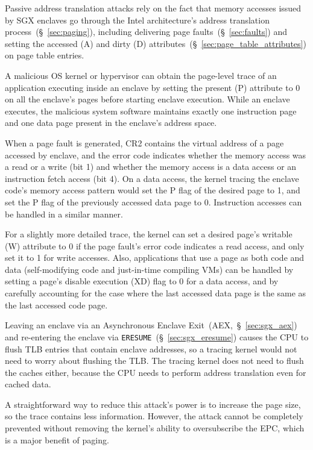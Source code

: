 Passive address translation attacks rely on the fact that memory accesses
issued by SGX enclaves go through the Intel architecture's address translation
process~(\S~\ref{sec:paging}), including delivering page
faults~(\S~\ref{sec:faults}) and setting the accessed (A) and dirty (D)
attributes~(\S~\ref{sec:page_table_attributes}) on page table entries.

A malicious OS kernel or hypervisor can obtain the page-level trace of an
application executing inside an enclave by setting the present (P) attribute to
0 on all the enclave's pages before starting enclave execution. While an
enclave executes, the malicious system software maintains exactly one
instruction page and one data page present in the enclave's address space.

When a page fault is generated, CR2 contains the virtual address of a page
accessed by enclave, and the error code indicates whether the memory access was
a read or a write (bit 1) and whether the memory access is a data access or
an instruction fetch access (bit 4). On a data access, the kernel tracing the
enclave code's memory access pattern would set the P flag of the desired page
to 1, and set the P flag of the previously accessed data page to 0. Instruction
accesses can be handled in a similar manner.

For a slightly more detailed trace, the kernel can set a desired page's
writable (W) attribute to 0 if the page fault's error code indicates a read
access, and only set it to 1 for write accesses. Also, applications that use a
page as both code and data (self-modifying code and just-in-time compiling VMs)
can be handled by setting a page's disable execution (XD) flag to 0 for a data
access, and by carefully accounting for the case where the last accessed data
page is the same as the last accessed code page.

Leaving an enclave via an Asynchronous Enclave Exit~(AEX,~\S~\ref{sec:sgx_aex})
and re-entering the enclave via \texttt{ERESUME}~(\S~\ref{sec:sgx_eresume})
causes the CPU to flush TLB entries that contain enclave addresses, so a
tracing kernel would not need to worry about flushing the TLB. The tracing
kernel does not need to flush the caches either, because the CPU needs to
perform address translation even for cached data.

A straightforward way to reduce this attack's power is to increase the page
size, so the trace contains less information. However, the attack cannot be
completely prevented without removing the kernel's ability to oversubscribe the
EPC, which is a major benefit of paging.


